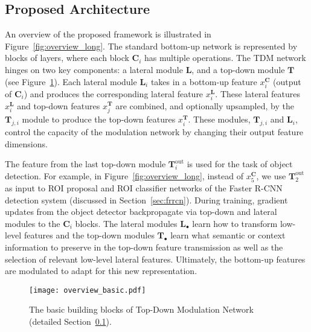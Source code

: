 \documentclass[10pt,twocolumn,letterpaper]{article}
\begin{document}
\vspace{-0.02in}
\subsection{Proposed Architecture}\label{sec:arch_details}
\vspace{-0.01in}
An overview of the proposed framework is illustrated in Figure~\ref{fig:overview_long}.
The standard bottom-up network is represented by blocks of layers, where each block $\mathbf{C}_i$ has multiple operations. The TDM network hinges on two key components: a lateral module $\mathbf{L}$, and a top-down module $\mathbf{T}$ (see Figure~\ref{fig:overview_short}). Each lateral module $\mathbf{L}_i$ takes in a bottom-up feature $x^\mathbf{C}_i$ (output of $\mathbf{C}_i$) and produces the corresponding lateral feature $x^\mathbf{L}_i$. These lateral features $x^\mathbf{L}_i$ and top-down features $x^\mathbf{T}_{j}$ are combined, and optionally upsampled, by the $\mathbf{T}_{j,i}$ module to produce the top-down features $x^\mathbf{T}_i$. These modules, $\mathbf{T}_{j,i}$ and $\mathbf{L}_i$, control the capacity of the modulation network by changing their output feature dimensions. 

The feature from the last top-down module $\mathbf{T}^\text{out}_i$ is used for the task of object detection. For example, in Figure~\ref{fig:overview_long}, instead of $x^\mathbf{C}_5$, we use $\mathbf{T}^\text{out}_2$ as input to ROI proposal and ROI classifier networks of the Faster R-CNN~\cite{ren2015faster} detection system (discussed in Section~\ref{sec:frrcn}). During training, gradient updates from the object detector backpropagate via top-down and lateral modules to the $\mathbf{C}_i$ blocks. The lateral modules $\mathbf{L}_\bullet$ learn how to transform low-level features and the top-down modules $\mathbf{T}_{\bullet}$ learn what semantic or context information to preserve in the top-down feature transmission as well as the selection of relevant low-level lateral features. Ultimately, the bottom-up features are modulated to adapt for this new representation. 

\begin{figure}[t]
    \centering
    \texttt{[image: overview\_basic.pdf]}
    \caption{The basic building blocks of Top-Down Modulation Network (detailed Section~\ref{sec:arch_details}).
    }
    \label{fig:overview_short}
    \vspace{-0.1in}
\end{figure}
\end{document}
